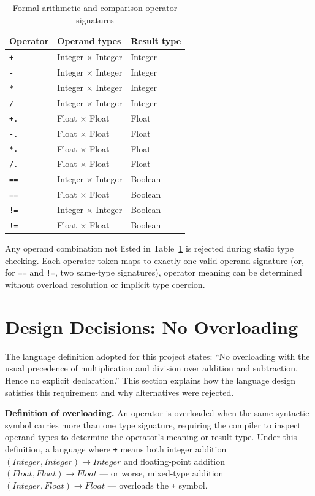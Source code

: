\begin{table}[H]
\centering
\caption{Formal arithmetic and comparison operator signatures}
\label{tab:operator-signatures}
\begin{tabular}{lll}
\toprule
Operator & Operand types & Result type \\
\midrule
\texttt{+}  & Integer $\times$ Integer & Integer \\
\texttt{-}  & Integer $\times$ Integer & Integer \\
\texttt{*}  & Integer $\times$ Integer & Integer \\
\texttt{/}  & Integer $\times$ Integer & Integer \\
\texttt{+.} & Float $\times$ Float     & Float \\
\texttt{-.} & Float $\times$ Float     & Float \\
\texttt{*.} & Float $\times$ Float     & Float \\
\texttt{/.} & Float $\times$ Float     & Float \\
\texttt{==} & Integer $\times$ Integer & Boolean \\
\texttt{==} & Float $\times$ Float     & Boolean \\
\texttt{!=} & Integer $\times$ Integer & Boolean \\
\texttt{!=} & Float $\times$ Float     & Boolean \\
\bottomrule
\end{tabular}
\end{table}

Any operand combination not listed in
Table~\ref{tab:operator-signatures} is rejected during static type checking.
Each operator token maps to exactly one valid operand signature
(or, for \texttt{==} and \texttt{!=}, two same-type signatures), operator
meaning can be determined without overload resolution or implicit type
coercion.

\section{Design Decisions: No Overloading}
\label{sec:no-overloading}
The language definition adopted for this project states: ``No overloading with the usual precedence
of multiplication and division over addition and subtraction. Hence no explicit
declaration.'' This section explains how the language design satisfies this
requirement and why alternatives were rejected.

\textbf{Definition of overloading.}
An operator is overloaded when the same syntactic symbol carries more than one
type signature, requiring the compiler to inspect operand types to determine the
operator's meaning or result type. Under this definition, a language where
\texttt{+} means both integer addition
$(\textit{Integer}, \textit{Integer}) \rightarrow \textit{Integer}$ and
floating-point addition $(\textit{Float}, \textit{Float}) \rightarrow \textit{Float}$
--- or worse, mixed-type addition
$(\textit{Integer}, \textit{Float}) \rightarrow \textit{Float}$ --- overloads the
\texttt{+} symbol.

